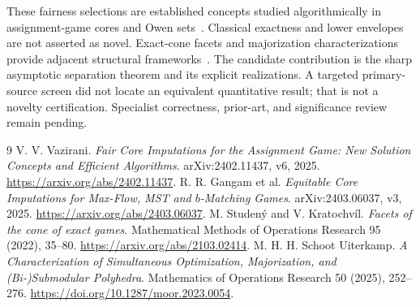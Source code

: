 \documentclass[11pt]{article}
\begin{document}
These fairness selections are established concepts studied algorithmically
in assignment-game cores and Owen sets~\cite{vazirani,gangam}.
Classical exactness and lower envelopes are not asserted as novel.
Exact-cone facets and majorization characterizations provide adjacent
structural frameworks~\cite{studeny,uiterkamp}. The candidate contribution
is the sharp asymptotic separation theorem and its explicit realizations.
A targeted primary-source screen did not locate an equivalent quantitative
result; that is not a novelty certification. Specialist correctness,
prior-art, and significance review remain pending.
\begin{thebibliography}{9}
 V. V. Vazirani.
\emph{Fair Core Imputations for the Assignment Game: New Solution Concepts
and Efficient Algorithms}. arXiv:2402.11437, v6, 2025.
\url{https://arxiv.org/abs/2402.11437}.
 R. R. Gangam et al.
\emph{Equitable Core Imputations for Max-Flow, MST and $b$-Matching Games}.
arXiv:2403.06037, v3, 2025. \url{https://arxiv.org/abs/2403.06037}.
 M. Studen\'y and V. Kratochv\'il.
\emph{Facets of the cone of exact games}.
Mathematical Methods of Operations Research 95 (2022), 35--80.
\url{https://arxiv.org/abs/2103.02414}.
 M. H. H. Schoot Uiterkamp.
\emph{A Characterization of Simultaneous Optimization, Majorization, and
(Bi-)Submodular Polyhedra}.
Mathematics of Operations Research 50 (2025), 252--276.
\url{https://doi.org/10.1287/moor.2023.0054}.
\end{thebibliography}
\end{document}
